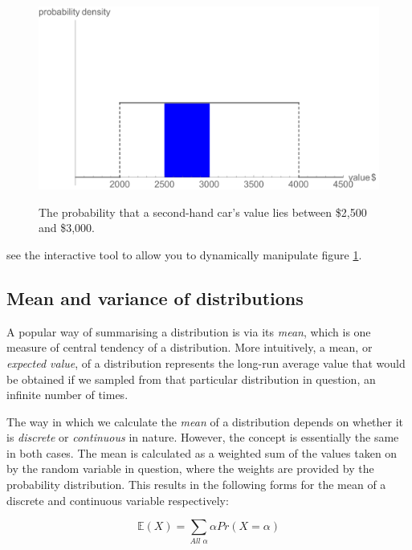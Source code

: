 \documentclass[11pt,fullpage]{book}
\begin{document}
\begin{figure}
\centering
\scalebox{0.5} 
{\includegraphics{Probability_continuousLotteryInterval.pdf}}
\caption{The probability that a second-hand car's value lies between \$2,500 and \$3,000.}\label{fig:Probability_continuousLotteryInterval}
\end{figure}


 see the interactive tool to allow you to dynamically manipulate figure \ref{fig:Probability_continuousLotteryInterval}.

\subsection{Mean and variance of distributions}\label{sec:Probability_meanVariance}
A popular way of summarising a distribution is via its \textit{mean}, which is one measure of central tendency of a distribution. More intuitively, a mean, or \textit{expected value}, of a distribution represents the long-run average value that would be obtained if we sampled from that particular distribution in question, an infinite number of times. 

The way in which we calculate the \textit{mean} of a distribution depends on whether it is \textit{discrete} or \textit{continuous} in nature. However, the concept is essentially the same in both cases. The mean is calculated as a weighted sum of the values taken on by the random variable in question, where the weights are provided by the probability distribution. This results in the following forms for the mean of a discrete and continuous variable respectively:

\begin{equation}\label{eq:Probability_meanDistributionDiscrete}
\mathbb{E}(X) = \sum\limits_{All\; \alpha} \alpha Pr(X=\alpha)
\end{equation}
\end{document}
